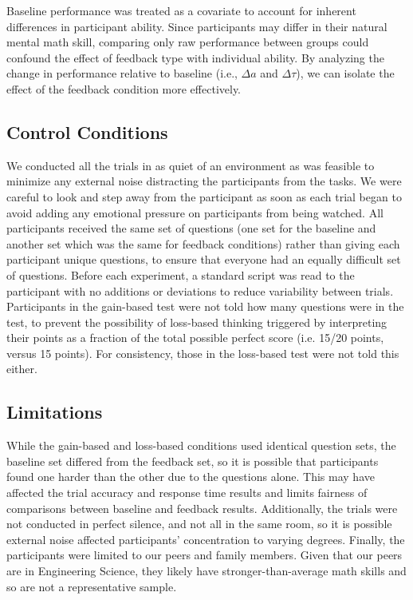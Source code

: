 \documentclass[12pt]{exam}
\begin{document}
Baseline performance was treated as a covariate to account for inherent differences in participant ability. Since participants may differ in their natural mental math skill, comparing only raw performance between groups could confound the effect of feedback type with individual ability. By analyzing the change in performance relative to baseline (i.e., $\Delta a$ and $\Delta \tau$), we can isolate the effect of the feedback condition more effectively.

\subsection{Control Conditions}
We conducted all the trials in as quiet of an environment as was feasible to minimize any external noise distracting the participants from the tasks. We were careful to look and step away from the participant as soon as each trial began to avoid adding any emotional pressure on participants from being watched. All participants received the same set of questions (one set for the baseline and another set which was the same for feedback conditions) rather than giving each participant unique questions, to ensure that everyone had an equally difficult set of questions. Before each experiment, a standard script was read to the participant with no additions or deviations to reduce variability between trials. Participants in the gain-based test were not told how many questions were in the test, to prevent the possibility of loss-based thinking triggered by interpreting their points as a fraction of the total possible perfect score (i.e. 15/20 points, versus 15 points). For consistency, those in the loss-based test were not told this either.

\subsection{Limitations}
While the gain-based and loss-based conditions used identical question sets, the baseline set differed from the feedback set, so it is possible that participants found one harder than the other due to the questions alone. This may have affected the trial accuracy and response time results and limits fairness of comparisons between baseline and feedback results. Additionally, the trials were not conducted in perfect silence, and not all in the same room, so it is possible external noise affected participants’ concentration to varying degrees. 
Finally, the participants were limited to our peers and family members. Given that our peers are in Engineering Science, they likely have stronger-than-average math skills and so are not a representative sample.
\end{document}

